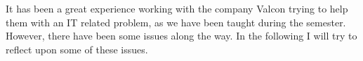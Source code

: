 It has been a great experience working with the company Valcon trying to help them with an IT related problem, as we have been taught during the semester.
However, there have been some issues along the way.
In the following I will try to reflect upon some of these issues.